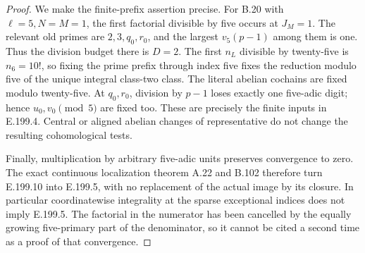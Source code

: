 \begin{proof}
We make the finite-prefix assertion precise.  For B.20 with
\(\ell=5,N=M=1\), the first factorial divisible by five occurs
at \(J_M=1\).  The relevant old primes are \(2,3,q_0,r_0\),
and the largest \(v_5(p-1)\) among them is one.  Thus the division
budget there is \(D=2\).  The first \(n_L\) divisible by twenty-five
is \(n_6=10!\), so fixing the prime prefix through index five
fixes the reduction modulo five of the unique integral class-two
class.  The literal abelian cochains are fixed modulo twenty-five.
At \(q_0,r_0\), division by \(p-1\) loses exactly one five-adic
digit; hence \(u_0,v_0\pmod5\) are fixed too.  These are precisely
the finite inputs in E.199.4.  Central or aligned abelian changes
of representative do not change the resulting cohomological tests.

Finally, multiplication by arbitrary five-adic units preserves
convergence to zero.  The exact continuous localization theorem
A.22 and B.102 therefore turn E.199.10 into E.199.5, with no
replacement of the actual image by its closure.  In particular
coordinatewise integrality at the sparse exceptional indices does
not imply E.199.5.  The factorial in the numerator has been cancelled
by the equally growing five-primary part of the denominator, so it
cannot be cited a second time as a proof of that convergence.
\end{proof}
